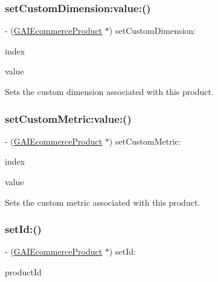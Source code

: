 \subsubsection{\texorpdfstring{set\+Custom\+Dimension\+:value\+:()}{setCustomDimension:value:()}}
{\footnotesize\ttfamily -\/ (\hyperlink{interface_g_a_i_ecommerce_product}{G\+A\+I\+Ecommerce\+Product} $\ast$) set\+Custom\+Dimension\+: \begin{DoxyParamCaption}\item[{(N\+S\+U\+Integer)}]{index }\item[{value:(N\+S\+String $\ast$)}]{value }\end{DoxyParamCaption}}

Sets the custom dimension associated with this product. \mbox{\label{interface_g_a_i_ecommerce_product_aaa2a6a29355051fa001dae01e65aa77d}} 
\subsubsection{\texorpdfstring{set\+Custom\+Metric\+:value\+:()}{setCustomMetric:value:()}}
{\footnotesize\ttfamily -\/ (\hyperlink{interface_g_a_i_ecommerce_product}{G\+A\+I\+Ecommerce\+Product} $\ast$) set\+Custom\+Metric\+: \begin{DoxyParamCaption}\item[{(N\+S\+U\+Integer)}]{index }\item[{value:(N\+S\+Number $\ast$)}]{value }\end{DoxyParamCaption}}

Sets the custom metric associated with this product. \mbox{\label{interface_g_a_i_ecommerce_product_ab7a68b9ae60da6769a27e9ed38b7791e}} 
\subsubsection{\texorpdfstring{set\+Id\+:()}{setId:()}}
{\footnotesize\ttfamily -\/ (\hyperlink{interface_g_a_i_ecommerce_product}{G\+A\+I\+Ecommerce\+Product} $\ast$) set\+Id\+: \begin{DoxyParamCaption}\item[{(N\+S\+String $\ast$)}]{product\+Id }\end{DoxyParamCaption}}

